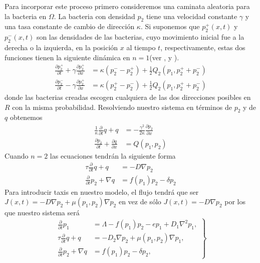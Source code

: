 \documentclass[portrait, a0b,final]{a0poster}%
\numberwithin{equation}{section}
\newenvironment{poster}{
  \begin{center}
  \begin{minipage}[c]{0.98\textwidth}
}{
  \end{minipage}
  \end{center}
}
\newenvironment{pcolumn}[1]{
  \begin{minipage}{#1\textwidth}
  \begin{center}
}{
  \end{center}
  \end{minipage}
}
\newcommand{\pbox}[4]{
\psshadowbox[#3]{
\begin{minipage}[t][#2][t]{#1}
#4
\end{minipage}
}}
\begin{document}
\begin{poster}
\begin{center}
\begin{pcolumn}{0.32}
{Para incorporar este proceso primero consideremos una caminata
aleatoria para la bacteria en $\Omega$. La bacteria con densidad
$p_{2}$ tiene una velocidad constante $\gamma$ y una tasa
constante de cambio de direcci\'{o}n $\kappa$. Si suponemos que
$p_{2}^{+}(x,t)$ y $p_{2}^{-}(x,t)$ son las densidades de las
bacterias, cuyo movimiento inicial fue a la derecha o la
izquierda, en la posici\'{o}n $x$ al tiempo $t$, respectivamente,
estas dos funciones tienen la siguiente din\'{a}mica en $n=1$(ver
\cite{KA74.1}, \cite{WE02.1} y \cite{HA98.1}).
\[\begin{aligned} \frac{\partial
p_{2}^{+}}{\partial t}+\gamma\frac{\partial p_{2}^{+}}{\partial x}
&=
\kappa(p_{2}^{-}-p_{2}^{+})+\frac{1}{2}Q_{2}(p_{1},p_{2}^{+}+p_{2}^{-})\\
\frac{\partial p_{2}^{-}}{\partial t}-\gamma\frac{\partial
p_{2}^{+}}{\partial x} &=
\kappa(p_{2}^{+}-p_{2}^{-})+\frac{1}{2}Q_{2}(p_{1},p_{2}^{+}+p_{2}^{-})
\end{aligned}\]
donde las bacterias creadas escogen cualquiera de las dos
direcciones posibles en $R$ con la misma probabilidad. Resolviendo
nuestro sistema en t\'{e}rminos de $p_{2}$ y de $q$ obtenemos
\[\begin{aligned}
\frac{1}{\kappa}\frac{\partial }{\partial t}q+q
&=-\frac{\gamma^{2}}{2\kappa}\frac{\partial p_{2}}{\partial x}\\
\frac{\partial p_{2}}{\partial t}+\frac{\partial q}{\partial x}
&=Q(p_{1},p_{2})
\end{aligned}\]
Cuando $n=2$ las ecuaciones tendr\'{a}n la siguiente forma
\[\begin{aligned}
\tau \frac{\partial }{\partial t}q+q &=-D\nabla p_{2}\\
\frac{\partial }{\partial t}p_{2}+\nabla q &= f(p_{1})p_{2}-\delta
p_{2}
\end{aligned}\]
Para introducir taxis en nuestro modelo, el flujo tendr\'{a} que ser
$J(x,t)=-D\nabla p_{2}+\mu(p_{1},p_{2}) \nabla p_{2}$ en vez de
s\'{o}lo $J(x,t)=-D\nabla p_{2} $ por los que nuestro sistema ser\'{a}
\begin{equation}
    \left.
    \begin{aligned}
        \frac{\partial }{\partial t}p_{1} &=\Lambda
        -f(p_{1})p_{2}-ep_{1}+D_{1}\nabla ^{2}p_{1},  \\
        \tau \frac{\partial }{\partial t}q+q &=-D_{2}\nabla p_{2}+\mu
        (p_{1},p_{2})\nabla p_{1}, \\
        \frac{\partial }{\partial t}p_{2}+\nabla q &=f(p_{1})p_{2}-\delta
        p_{2},
    \end{aligned}
    \right\}\label{sis2.1}
\end{equation}
}
\end{pcolumn}
\begin{pcolumn}{0.32}
\pbox{0.9\textwidth}{95cm}{linewidth=2mm,framearc=0.1,linecolor=lightblue,fillstyle=gradient,gradangle=0,gradbegin=white,gradend=white,gradmidpoint=1.0,framesep=1em}{

}
\end{pcolumn}
\end{center}
\end{poster}
\end{document}

